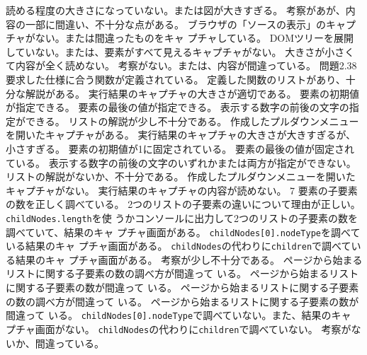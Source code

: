 {{{ 読める程度の大きさになっていない。または図が大きすぎる。}
 {考察があが、内容の一部に間違い、不十分な点がある。}
 }
 {
 {ブラウザの「ソースの表示」のキャプチャがない。または間違ったものをキャ
 プチャしている。}
 {DOMツリーを展開していない。または、要素がすべて見えるキャプチャがない。
 大きさが小さくて内容が全く読めない。}
 {考察がない。または、内容が間違っている。}
 }
{問題2.3}{8}
 {
 {要求した仕様に合う関数が定義されている。}
 {定義した関数のリストがあり、十分な解説がある。}
 {実行結果のキャプチャの大きさが適切である。}
 }
 {
 {要素の初期値が指定できる。}
 {要素の最後の値が指定できる。}
 {表示する数字の前後の文字の指定ができる。}
 {リストの解説が少し不十分である。}
 {作成したプルダウンメニューを開いたキャプチャがある。}
 {実行結果のキャプチャの大きさが大きすぎるが、小さすぎる。}
 }
 {
 {要素の初期値が1に固定されている。}
 {要素の最後の値が固定されている。}
 {表示する数字の前後の文字のいずれかまたは両方が指定ができない。}
 {リストの解説がないか、不十分である。}
 {作成したプルダウンメニューを開いたキャプチャがない。}
 {実行結果のキャプチャの内容が読めない。}
 }
{}{7}
 {
 {要素の子要素の数を正しく調べている。}
 {2つのリストの子要素の違いについて理由が正しい。}
 }
 {
 {\texttt{childNodes.length}を使
 うかコンソールに出力して2つのリストの子要素の数を調べていて、結果のキャ
 プチャ画面がある。}
 {\texttt{childNodes[0].nodeType}を調べている結果のキャ
 プチャ画面がある。}
 {\texttt{childNodes}の代わりに\texttt{children}で調べている結果のキャ
 プチャ画面がある。}
 {考察が少し不十分である。}
 }
 {
 {\pageref{pulldown1}ページから始まるリストに関する子要素の数の調べ方が間違って
 いる。}
 {\pageref{pulldown1}ページから始まるリストに関する子要素の数が間違って
 いる。}
 {\pageref{pulldown2}ページから始まるリストに関する子要素の数の調べ方が間違って
 いる。}
 {\pageref{pulldown2}ページから始まるリストに関する子要素の数が間違って
 いる。}
 {\texttt{childNodes[0].nodeType}で調べていない。また、結果のキャ
 プチャ画面がない。}
 {\texttt{childNodes}の代わりに\texttt{children}で調べていない。}
 {考察がないか、間違っている。}
 }
}